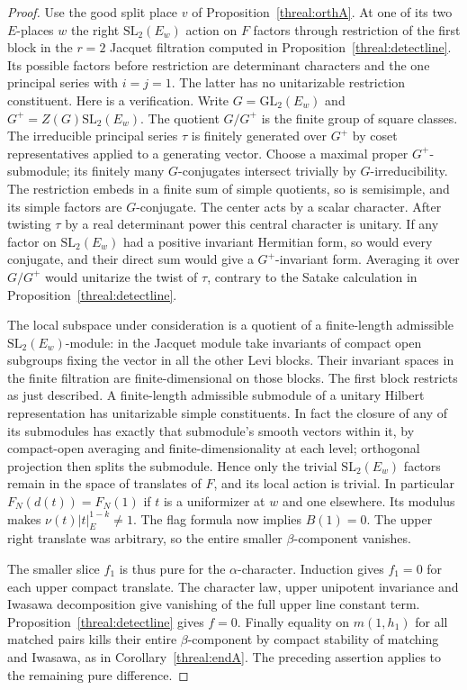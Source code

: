\begin{proof}
Use the good split place \(v\) of Proposition~\ref{threal:orthA}.
At one of its two \(E\)-places \(w\) the right
\(\mathrm{SL}_2(E_w)\) action on \(F\) factors through restriction
of the first block in the \(r=2\) Jacquet filtration computed in
Proposition~\ref{threal:detectline}. Its possible factors before
restriction are determinant characters and the one principal series
with \(i=j=1\). The latter has no unitarizable restriction
constituent. Here is a verification. Write \(G=\mathrm{GL}_2(E_w)\)
and \(G^+=Z(G)\mathrm{SL}_2(E_w)\). The quotient \(G/G^+\) is
the finite group of square classes. The irreducible principal
series \(\tau\) is finitely generated over \(G^+\) by coset
representatives applied to a generating vector. Choose a maximal
proper \(G^+\)-submodule; its finitely many \(G\)-conjugates
intersect trivially by \(G\)-irreducibility. The restriction
embeds in a finite sum of simple quotients, so is semisimple, and
its simple factors are \(G\)-conjugate. The center acts by a scalar
character. After twisting \(\tau\) by a real determinant power this
central character is unitary. If any factor on \(\mathrm{SL}_2(E_w)\)
had a positive invariant Hermitian form, so would every conjugate,
and their direct sum would give a \(G^+\)-invariant form.
Averaging it over \(G/G^+\) would unitarize the twist of \(\tau\),
contrary to the Satake calculation in Proposition~\ref{threal:detectline}.

The local subspace under consideration is a quotient of a
finite-length admissible \(\mathrm{SL}_2(E_w)\)-module: in the
Jacquet module take invariants of compact open subgroups fixing
the vector in all the other Levi blocks. Their invariant spaces
in the finite filtration are finite-dimensional on those blocks.
The first block restricts as just described. A finite-length
admissible submodule of a unitary Hilbert representation has
unitarizable simple constituents. In fact the closure of any of
its submodules has exactly that submodule's smooth vectors within
it, by compact-open averaging and finite-dimensionality at each
level; orthogonal projection then splits the submodule. Hence
only the trivial \(\mathrm{SL}_2(E_w)\) factors remain in the
space of translates of \(F\), and its local action is trivial.
In particular \(F_N(d(t))=F_N(1)\) if \(t\) is a uniformizer
at \(w\) and one elsewhere. Its modulus makes
\(\nu(t)|t|_E^{1-k}\ne1\). The flag formula now implies \(B(1)=0\).
The upper right translate was arbitrary, so the entire smaller
\(\beta\)-component vanishes.

The smaller slice \(f_1\) is thus pure for the \(\alpha\)-character.
Induction gives \(f_1=0\) for each upper compact translate.
The character law, upper unipotent invariance and Iwasawa
decomposition give vanishing of the full upper line constant term.
Proposition~\ref{threal:detectline} gives \(f=0\).
Finally equality on \(m(1,h_1)\) for all matched pairs kills
their entire \(\beta\)-component by compact stability of matching
and Iwasawa, as in Corollary~\ref{threal:endA}. The preceding
assertion applies to the remaining pure difference.
\end{proof}

